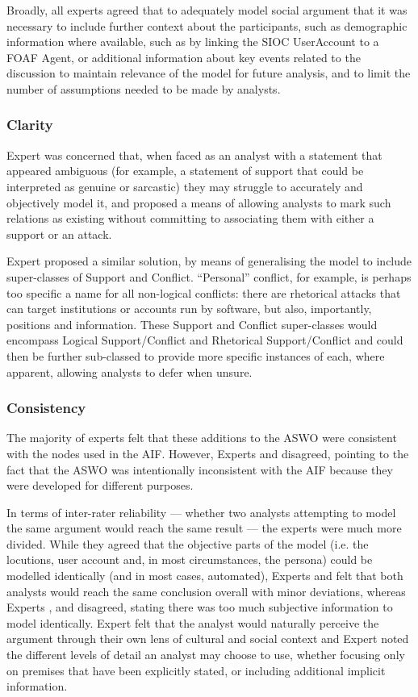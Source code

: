 Broadly, all experts agreed that to adequately model social argument that it was necessary to include further context about the participants, such as demographic information where available, such as by linking the SIOC UserAccount to a FOAF Agent, or additional information about key events related to the discussion to maintain relevance of the model for future analysis, and to limit the number of assumptions needed to be made by analysts.


\subsubsection{Clarity}
Expert \lizzy was concerned that, when faced as an analyst with a statement that appeared ambiguous (for example, a statement of support that could be interpreted as genuine or sarcastic) they may struggle to accurately and objectively model it, and proposed a means of allowing analysts to mark such relations as existing without committing to associating them with either a support or an attack.

Expert \chris proposed a similar solution, by means of generalising the model to include super-classes of Support and Conflict. ``Personal'' conflict, for example, is perhaps too specific a name for all non-logical conflicts: there are rhetorical attacks that can target institutions or accounts run by software, but also, importantly, positions and information. These Support and Conflict super-classes would encompass Logical Support/Conflict and Rhetorical Support/Conflict and could then be further sub-classed to provide more specific instances of each, where apparent, allowing analysts to defer when unsure.


\subsubsection{Consistency}

The majority of experts felt that these additions to the ASWO were consistent with the nodes used in the AIF. However, Experts \bob and \chris disagreed, pointing to the fact that the ASWO was intentionally inconsistent with the AIF because they were developed for different purposes.

In terms of inter-rater reliability --- whether two analysts attempting to model the same argument would reach the same result --- the experts were much more divided. While they agreed that the objective parts of the model (i.e. the locutions, user account and, in most circumstances, the persona) could be modelled identically (and in most cases, automated), Experts \bob and \jodi felt that both analysts would reach the same conclusion overall with minor deviations, whereas Experts \simon, \lizzy and \ash disagreed, stating there was too much subjective information to model identically. Expert \simon felt that the analyst would naturally perceive the argument through their own lens of cultural and social context and Expert \lizzy noted the different levels of detail an analyst may choose to use, whether focusing only on premises that have been explicitly stated, or including additional implicit information.

